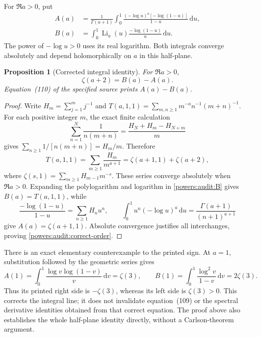 \documentclass[11pt,a4paper]{article}
\numberwithin{equation}{section}
\newtheorem{proposition}[theorem]{Proposition}
\theoremstyle{definition}
\theoremstyle{remark}
\DeclareMathOperator{\Li}{Li}
\newcommand{\dd}{\mathrm d}
\begin{document}
For \(\Re a>0\), put
\begin{align}
 A(a)&=\frac1{\Gamma(a+1)}\int_0^1
       \frac{(-\log u)^a[-\log(1-u)]}{1-u}\,\dd u,
       \label{powers:audit:A}\\
 B(a)&=\int_0^1\Li_a(u)
                  \frac{-\log(1-u)}u\,\dd u.
       \label{powers:audit:B}
\end{align}
The power of \(-\log u>0\) uses its real logarithm. Both integrals
converge absolutely and depend holomorphically on \(a\) in this
half-plane.

\begin{proposition}[Corrected integral identity]
\label{powers:audit:BB-correction}
For \(\Re a>0\),
\begin{equation}
 \boxed{\displaystyle
 \zeta(a+2)=B(a)-A(a).}
 \label{powers:audit:correct-order}
\end{equation}
Equation~(110) of the specified source prints \(A(a)-B(a)\).
\end{proposition}

\begin{proof}
Write \(H_m=\sum_{j=1}^m j^{-1}\) and
\(T(a,1,1)=\sum_{m,n\ge1}m^{-a}n^{-1}(m+n)^{-1}\).
For each positive integer \(m\), the exact finite calculation
\[
 \sum_{n=1}^N\frac1{n(m+n)}
 =\frac{H_N+H_m-H_{N+m}}m
\]
gives \(\sum_{n\ge1}1/[n(m+n)]=H_m/m\). Therefore
\begin{equation}
 T(a,1,1)=\sum_{m\ge1}\frac{H_m}{m^{a+1}}
         =\zeta(a+1,1)+\zeta(a+2),
 \label{powers:audit:direct-T}
\end{equation}
where \(\zeta(s,1)=\sum_{m\ge1}H_{m-1}m^{-s}\).
These series converge absolutely when \(\Re a>0\).
Expanding the polylogarithm and logarithm in
\eqref{powers:audit:B} gives \(B(a)=T(a,1,1)\), while
\[
 \frac{-\log(1-u)}{1-u}=\sum_{n\ge1}H_nu^n,
 \qquad
 \int_0^1u^n(-\log u)^a\,\dd u
       =\frac{\Gamma(a+1)}{(n+1)^{a+1}}
\]
give \(A(a)=\zeta(a+1,1)\). Absolute convergence justifies all
interchanges, proving \eqref{powers:audit:correct-order}.
\end{proof}

There is an exact elementary counterexample to the printed sign.
At \(a=1\), substitution followed by the geometric series gives
\[
 A(1)=\int_0^1\frac{\log v\log(1-v)}v\,\dd v=\zeta(3),
 \qquad
 B(1)=\int_0^1\frac{\log^2v}{1-v}\,\dd v=2\zeta(3).
\]
Thus its printed right side is \(-\zeta(3)\), whereas its left
side is \(\zeta(3)>0\). This corrects the integral line; it does
not invalidate equation~(109) or the spectral derivative identities
obtained from that correct equation. The proof above also establishes
the whole half-plane identity directly, without a Carlson-theorem
argument.
\end{document}
